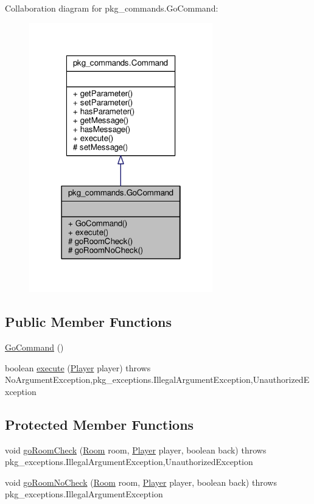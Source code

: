 Collaboration diagram for pkg\-\_\-commands.\-Go\-Command\-:
\nopagebreak
\begin{figure}[H]
\begin{center}
\leavevmode
\includegraphics[width=226pt]{classpkg__commands_1_1GoCommand__coll__graph}
\end{center}
\end{figure}
\subsection*{Public Member Functions}
\begin{DoxyCompactItemize}
\item 
\hyperlink{classpkg__commands_1_1GoCommand_af87b7ac858440df2c3d850c89441f4c7}{Go\-Command} ()
\item 
boolean \hyperlink{classpkg__commands_1_1GoCommand_a82e9a64a0fac612f788060a90c83f9b1}{execute} (\hyperlink{classpkg__world_1_1Player}{Player} player)  throws No\-Argument\-Exception,pkg\-\_\-exceptions.\-Illegal\-Argument\-Exception,\-Unauthorized\-Exception 
\end{DoxyCompactItemize}
\subsection*{Protected Member Functions}
\begin{DoxyCompactItemize}
\item 
void \hyperlink{classpkg__commands_1_1GoCommand_acbf1aa81fa5b1aef7cafb8b4e3ace3a9}{go\-Room\-Check} (\hyperlink{classpkg__world_1_1Room}{Room} room, \hyperlink{classpkg__world_1_1Player}{Player} player, boolean back)  throws pkg\-\_\-exceptions.\-Illegal\-Argument\-Exception,\-Unauthorized\-Exception 
\item 
void \hyperlink{classpkg__commands_1_1GoCommand_a210afbc5f3ef34d3ad5759d853c8f8c2}{go\-Room\-No\-Check} (\hyperlink{classpkg__world_1_1Room}{Room} room, \hyperlink{classpkg__world_1_1Player}{Player} player, boolean back)  throws pkg\-\_\-exceptions.\-Illegal\-Argument\-Exception 
\end{DoxyCompactItemize}


